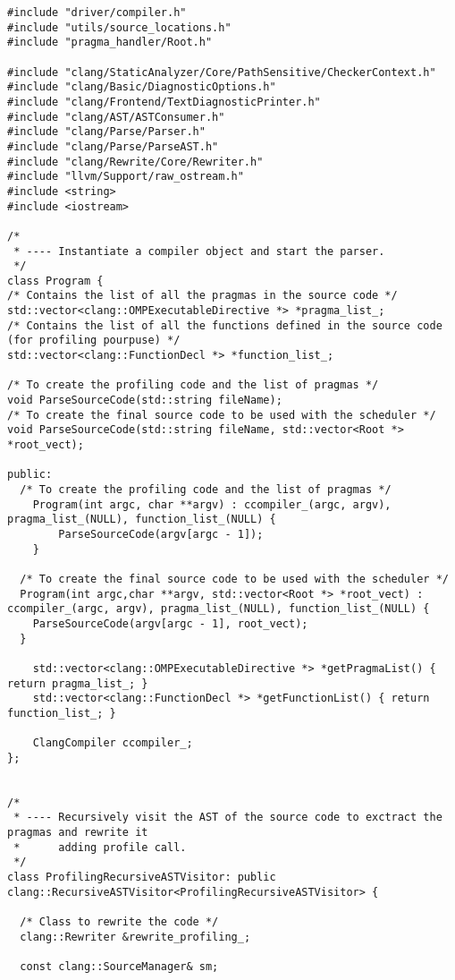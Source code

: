 \documentclass[a4paper,11pt,twoside]{book}
\begin{document}
\begin{lstlisting}[language=CCC, caption=driver/program.h]
#include "driver/compiler.h"
#include "utils/source_locations.h"
#include "pragma_handler/Root.h"

#include "clang/StaticAnalyzer/Core/PathSensitive/CheckerContext.h"
#include "clang/Basic/DiagnosticOptions.h"
#include "clang/Frontend/TextDiagnosticPrinter.h"
#include "clang/AST/ASTConsumer.h"
#include "clang/Parse/Parser.h"
#include "clang/Parse/ParseAST.h"
#include "clang/Rewrite/Core/Rewriter.h"
#include "llvm/Support/raw_ostream.h"
#include <string>
#include <iostream>

/*
 * ---- Instantiate a compiler object and start the parser. 
 */
class Program {
/* Contains the list of all the pragmas in the source code */
std::vector<clang::OMPExecutableDirective *> *pragma_list_;
/* Contains the list of all the functions defined in the source code (for profiling pourpuse) */
std::vector<clang::FunctionDecl *> *function_list_;

/* To create the profiling code and the list of pragmas */
void ParseSourceCode(std::string fileName);
/* To create the final source code to be used with the scheduler */
void ParseSourceCode(std::string fileName, std::vector<Root *> *root_vect);

public:
  /* To create the profiling code and the list of pragmas */
	Program(int argc, char **argv) : ccompiler_(argc, argv), pragma_list_(NULL), function_list_(NULL) {
		ParseSourceCode(argv[argc - 1]);
	}

  /* To create the final source code to be used with the scheduler */
  Program(int argc,char **argv, std::vector<Root *> *root_vect) : ccompiler_(argc, argv), pragma_list_(NULL), function_list_(NULL) {
    ParseSourceCode(argv[argc - 1], root_vect);
  }

	std::vector<clang::OMPExecutableDirective *> *getPragmaList() { return pragma_list_; }
	std::vector<clang::FunctionDecl *> *getFunctionList() { return function_list_; }

	ClangCompiler ccompiler_;
};


/*
 * ---- Recursively visit the AST of the source code to exctract the pragmas and rewrite it
 *      adding profile call.
 */
class ProfilingRecursiveASTVisitor: public clang::RecursiveASTVisitor<ProfilingRecursiveASTVisitor> {

  /* Class to rewrite the code */
  clang::Rewriter &rewrite_profiling_;
  
  const clang::SourceManager& sm;


\end{lstlisting}
\end{document}
